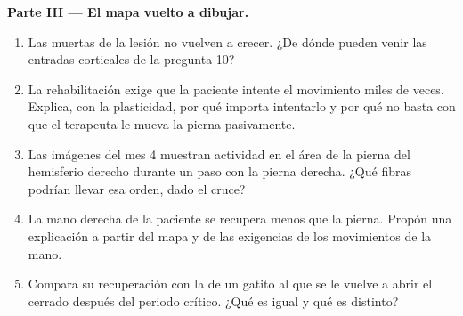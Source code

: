 \begin{problem}
\medskip
\noindent\textbf{Parte III --- El mapa vuelto a dibujar.}
\begin{enumerate}[resume]
  \item Las  muertas de la lesión no vuelven a crecer. ¿De
        dónde pueden venir las entradas corticales de la pregunta 10?
  \item La rehabilitación exige que la paciente intente el movimiento
        miles de veces. Explica, con la plasticidad, por qué importa
        intentarlo y por qué no basta con que el terapeuta le mueva la
        pierna pasivamente.
  \item Las imágenes del mes 4 muestran actividad en el área de la
        pierna del hemisferio derecho durante un paso con la pierna
        derecha. ¿Qué fibras podrían llevar esa orden, dado el cruce?
  \item La mano derecha de la paciente se recupera menos que la pierna.
        Propón una explicación a partir del mapa y de las exigencias de
        los movimientos de la mano.
  \item Compara su recuperación con la de un gatito al que se le vuelve
        a abrir el  cerrado después del periodo crítico. ¿Qué es
        igual y qué es distinto?
\end{enumerate}


\end{problem}
